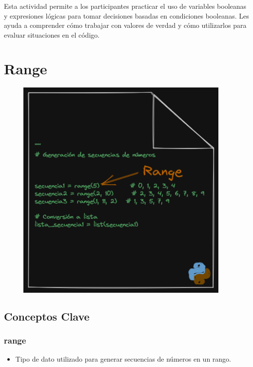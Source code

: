 \documentclass[
  a4paper,
  DIV=11,
  numbers=noendperiod,
  onepage,
  openany]{scrreprt}
\providecommand{\tightlist}{%
  \setlength{\itemsep}{0pt}\setlength{\parskip}{0pt}}\usepackage{longtable,booktabs,array}
\begin{document}
Esta actividad permite a los participantes practicar el uso de variables
booleanas y expresiones lógicas para tomar decisiones basadas en
condiciones booleanas. Les ayuda a comprender cómo trabajar con valores
de verdad y cómo utilizarlos para evaluar situaciones en el código.

\chapter{Range}\label{range}

\begin{figure}

{\centering \includegraphics[width=4.16667in,height=\textheight]{unidades/unidad3/images/range.png}

}

\end{figure}

\section{Conceptos Clave}\label{conceptos-clave-11}

\subsection{range}\label{range-1}

\begin{itemize}
\tightlist
\item
  Tipo de dato utilizado para generar secuencias de números en un rango.
\end{itemize}
\end{document}
